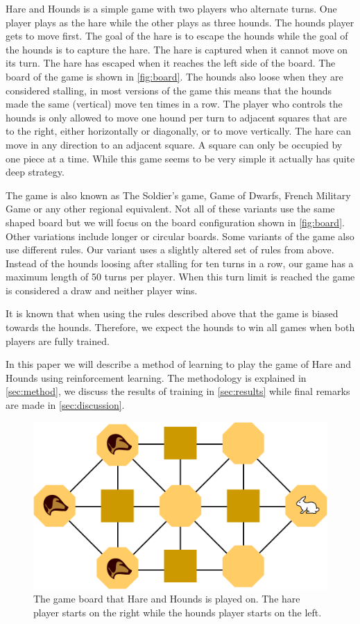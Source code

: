 Hare and Hounds is a simple game with two players who alternate turns. One
player plays as the hare while the other plays as three hounds. The hounds
player gets to move first. The goal of the
hare is to escape the hounds while the goal of the hounds is to capture the
hare. The hare is captured when it cannot move on its turn. The hare has escaped
when it reaches the left side of the board. The board of the game is shown in
\autoref{fig:board}. The hounds also loose when they are considered stalling,
in most versions of the game this means that the hounds made the same
(vertical) move ten times in a row. The player who controls the hounds is only
allowed to move one hound per turn to adjacent squares that are to the right,
either horizontally or diagonally, or to move vertically. The hare can move in
any direction to an adjacent square. A square can only be occupied by one piece
at a time. While this game seems to be very simple it actually has quite deep
strategy.

The game is also known as The Soldier's game, Game of Dwarfs, French Military
Game or any other regional equivalent. Not all of these variants use the same
shaped board but we will focus on the board configuration shown in
\autoref{fig:board}. Other variations include longer or circular boards.
Some variants of the game also use different rules. Our variant uses a slightly
altered set of rules from above. Instead of the hounds loosing after stalling
for ten turns in a row, our game has a maximum length of 50 turns per player.
When this turn limit is reached the game is considered a draw and neither
player wins.

It is known that when using the rules described above that the game is biased
towards the hounds\cite{gardner1961second}. Therefore, we expect the hounds to win all games
when  both players are fully trained. 

In this paper we will describe a method of learning to play the game of Hare
and Hounds using reinforcement learning. The methodology is explained in
\autoref{sec:method}, we discuss the results of training in
\autoref{sec:results} while final remarks are made in \autoref{sec:discussion}.

\begin{figure}[h]
	\centering
	\includegraphics[width=.75\textwidth]{Hare_and_Hounds_board.png}
	\caption{The game board that Hare and Hounds is played on. The hare player
		starts on the right while the hounds player starts on the left.}
	\label{fig:board}
\end{figure}
